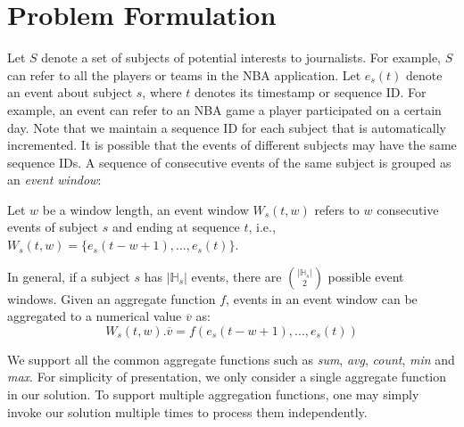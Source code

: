 \section{Problem Formulation}\label{sec:problem_definition}
Let $S$ denote a set of subjects of potential interests to journalists. 
For example, $S$ can refer to all the players or teams in the NBA application.
%
%
Let $e_s(t)$ denote an event about subject $s$, where $t$ denotes its timestamp or sequence ID. For example, an event can refer to an NBA game a player participated on a certain day. Note that we maintain a sequence ID for each subject that is automatically incremented. It is possible that the events of different subjects may have the same sequence IDs. A sequence of consecutive events of the same subject is grouped as an \textit{event window}:


\begin{definition}
Let $w$ be a window length, an event window $W_s(t,w)$ refers to $w$ consecutive events of subject $s$ and ending at sequence $t$, i.e., $W_s(t,w)=\{e_s(t-w+1),..., e_s(t)\}$.
\end{definition}

In general, if a subject $s$ has $|\mathbb{H}_s|$ events, there are $|\mathbb{H}_s|\choose{2}$ possible event windows. Given an aggregate function $f$, events in an event window can be aggregated to a numerical value $\overline{v}$ as:
$$W_s(t,w).\overline{v} = f(e_s(t-w+1),..., e_s(t))$$

We support all the common aggregate functions such as \emph{sum}, \emph{avg}, \emph{count}, \emph{min} and \emph{max}. 
For simplicity of presentation, we only consider a single aggregate function in our solution. To support multiple aggregation functions, one may simply invoke our solution multiple times to process them independently.

